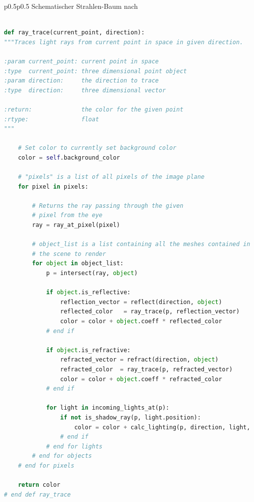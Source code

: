 \begin{table}[H]
\begin{tabular}{p{0.5\textwidth}p{0.5\textwidth}}
            Schematischer Strahlen-Baum
            nach~\citeauthor{glassner_introduction_1989}\protect\footnotemark{} \\
        \bottomrule
    \end{tabular}
\end{table}

\begin{minipage}{\linewidth}
\begin{lstlisting}[language=Python,caption={Eine abstrakte Umsetzung des
        Ray Tracings \protect\footnotemark.},
    label={fig:ray_tracing:high_level},captionpos=b,emph={ray_trace}]

def ray_trace(current_point, direction):
"""Traces light rays from current point in space in given direction.

:param current_point: current point in space
:type  current_point: three dimensional point object
:param direction:     the direction to trace
:type  direction:     three dimensional vector

:return:              the color for the given point
:rtype:               float
"""

    # Set color to currently set background color
    color = self.background_color

    # "pixels" is a list of all pixels of the image plane
    for pixel in pixels:

        # Returns the ray passing through the given
        # pixel from the eye
        ray = ray_at_pixel(pixel)

        # object_list is a list containing all the meshes contained in
        # the scene to render
        for object in object_list:
            p = intersect(ray, object)

            if object.is_reflective:
                reflection_vector = reflect(direction, object)
                reflected_color   = ray_trace(p, reflection_vector)
                color = color + object.coeff * reflected_color
            # end if

            if object.is_refractive:
                refracted_vector = refract(direction, object)
                refracted_color  = ray_trace(p, refracted_vector)
                color = color + object.coeff * refracted_color
            # end if

            for light in incoming_lights_at(p):
                if not is_shadow_ray(p, light.position):
                    color = color + calc_lighting(p, direction, light, object)
                # end if
            # end for lights
        # end for objects
    # end for pixels

    return color
# end def ray_trace
\end{lstlisting}
\end{minipage}
